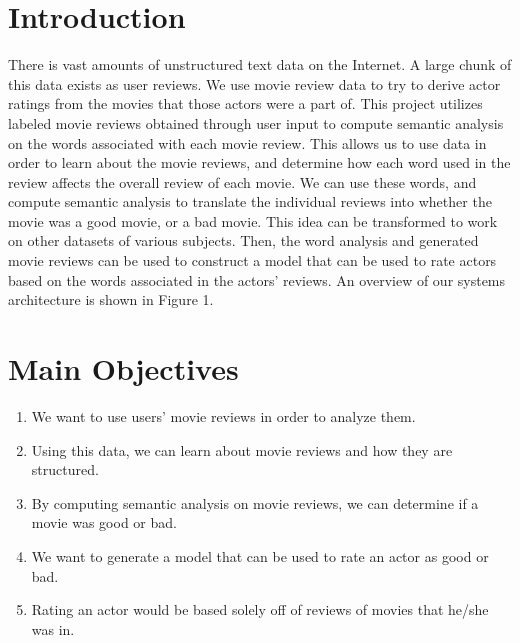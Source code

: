 \documentclass[a0,portrait]{a0poster}
\begin{document}
\begin{multicols}{2} %

\color{DarkSlateGray} %
\section*{Introduction}

There is vast amounts of unstructured text data on the Internet.  A large chunk of this data exists as user reviews. We use movie review data to try to derive actor ratings from the movies that those actors were a part of.  This project utilizes labeled movie reviews obtained through user input to compute semantic analysis on the words associated with each movie review.  This allows us to use data in order to learn about the movie reviews, and determine how each word used in the review affects the overall review of each movie.  We can use these words, and compute semantic analysis to translate the individual reviews into whether the movie was a good movie, or a bad movie.  This idea can be transformed to work on other datasets of various subjects.  Then, the word analysis and generated movie reviews can be used to construct a model that can be used to rate actors based on the words associated in the actors’ reviews. An overview of our systems architecture is shown in Figure 1. 


\section*{Main Objectives}

\begin{enumerate}
\item We want to use users’ movie reviews in order to analyze them.
\item Using this data, we can learn about movie reviews and how they are structured.
\item By computing semantic analysis on movie reviews, we can determine if a movie was good or bad.
\item We want to generate a model that can be used to rate an actor as good or bad.
\item Rating an actor would be based solely off of reviews of movies that he/she was in.
\end{enumerate}


\end{multicols}
\end{document}
